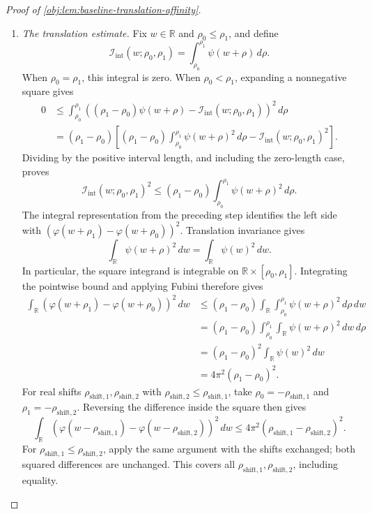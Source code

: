 \begin{proof}[Proof of \cref{obj:lem:baseline-translation-affinity}]
\begin{enumerate}
\item \emph{The translation estimate.}
Fix \(w\in\mathbb R\) and \(\rho_0\le\rho_1\), and define
\[
\mathcal I_{\mathrm{int}}(w;\rho_0,\rho_1)
=\int_{\rho_0}^{\rho_1}\psi(w+\rho)\,d\rho.
\]
When \(\rho_0=\rho_1\), this integral is zero. When \(\rho_0<\rho_1\), expanding a nonnegative square gives
\[
\begin{aligned}
0
&\le
\int_{\rho_0}^{\rho_1}
\left((\rho_1-\rho_0)\psi(w+\rho)
      -\mathcal I_{\mathrm{int}}(w;\rho_0,\rho_1)\right)^2\,d\rho\\
&=(\rho_1-\rho_0)
\left[
(\rho_1-\rho_0)\int_{\rho_0}^{\rho_1}\psi(w+\rho)^2\,d\rho
-\mathcal I_{\mathrm{int}}(w;\rho_0,\rho_1)^2
\right].
\end{aligned}
\]
Dividing by the positive interval length, and including the zero-length case, proves
\[
\mathcal I_{\mathrm{int}}(w;\rho_0,\rho_1)^2
\le
(\rho_1-\rho_0)\int_{\rho_0}^{\rho_1}\psi(w+\rho)^2\,d\rho.
\]
The integral representation from the preceding step identifies the left side with
\((\varphi(w+\rho_1)-\varphi(w+\rho_0))^2\).
Translation invariance gives
\[
\int_{\mathbb R}\psi(w+\rho)^2\,dw
=\int_{\mathbb R}\psi(w)^2\,dw.
\]
In particular, the square integrand is integrable on
\(\mathbb R\times[\rho_0,\rho_1]\). Integrating the pointwise bound and applying Fubini therefore gives
\[
\begin{aligned}
\int_{\mathbb R}
(\varphi(w+\rho_1)-\varphi(w+\rho_0))^2\,dw
&\le
(\rho_1-\rho_0)
\int_{\mathbb R}\int_{\rho_0}^{\rho_1}
\psi(w+\rho)^2\,d\rho\,dw\\
&=(\rho_1-\rho_0)
\int_{\rho_0}^{\rho_1}\int_{\mathbb R}
\psi(w+\rho)^2\,dw\,d\rho\\
&=(\rho_1-\rho_0)^2\int_{\mathbb R}\psi(w)^2\,dw\\
&=4\pi^2(\rho_1-\rho_0)^2.
\end{aligned}
\]
For real shifts \(\rho_{\mathrm{shift},1},\rho_{\mathrm{shift},2}\) with \(\rho_{\mathrm{shift},2}\le\rho_{\mathrm{shift},1}\), take \(\rho_0=-\rho_{\mathrm{shift},1}\) and \(\rho_1=-\rho_{\mathrm{shift},2}\). Reversing the difference inside the square then gives
\[
\int_{\mathbb R}(\varphi(w-\rho_{\mathrm{shift},1})-\varphi(w-\rho_{\mathrm{shift},2}))^2\,dw
\le4\pi^2(\rho_{\mathrm{shift},1}-\rho_{\mathrm{shift},2})^2.
\]
For \(\rho_{\mathrm{shift},1}\le\rho_{\mathrm{shift},2}\), apply the same argument with the shifts exchanged; both squared differences are unchanged. This covers all \(\rho_{\mathrm{shift},1},\rho_{\mathrm{shift},2}\), including equality.


\end{enumerate}
\end{proof}
